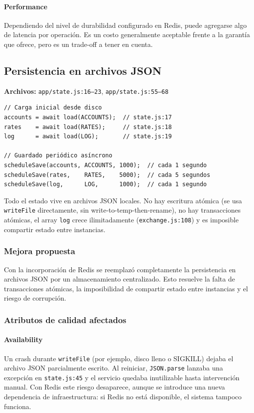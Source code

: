\paragraph{Performance}
Dependiendo del nivel de durabilidad configurado en Redis, puede agregarse algo de latencia por operación. Es un costo generalmente aceptable frente a la garantía que ofrece, pero es un trade-off a tener en cuenta.

\subsection{Persistencia en archivos JSON}

\textbf{Archivos:} \texttt{app/state.js:16--23}, \texttt{app/state.js:55--68}

\begin{verbatim}
// Carga inicial desde disco
accounts = await load(ACCOUNTS);  // state.js:17
rates    = await load(RATES);     // state.js:18
log      = await load(LOG);       // state.js:19

// Guardado periódico asíncrono
scheduleSave(accounts, ACCOUNTS, 1000);  // cada 1 segundo
scheduleSave(rates,    RATES,    5000);  // cada 5 segundos
scheduleSave(log,      LOG,      1000);  // cada 1 segundo
\end{verbatim}

Todo el estado vive en archivos JSON locales. No hay escritura atómica (se usa \texttt{writeFile} directamente, sin write-to-temp-then-rename), no hay transacciones atómicas, el array \texttt{log} crece ilimitadamente (\texttt{exchange.js:108}) y es imposible compartir estado entre instancias.

\subsubsection{Mejora propuesta}

Con la incorporación de Redis se reemplazó completamente la persistencia en archivos JSON por un almacenamiento centralizado. Esto resuelve la falta de transacciones atómicas, la imposibilidad de compartir estado entre instancias y el riesgo de corrupción.

\subsubsection{Atributos de calidad afectados}

\paragraph{Availability}
Un crash durante \texttt{writeFile} (por ejemplo, disco lleno o SIGKILL) dejaba el archivo JSON parcialmente escrito. Al reiniciar, \texttt{JSON.parse} lanzaba una excepción en \texttt{state.js:45} y el servicio quedaba inutilizable hasta intervención manual. Con Redis este riesgo desaparece, aunque se introduce una nueva dependencia de infraestructura: si Redis no está disponible, el sistema tampoco funciona.

